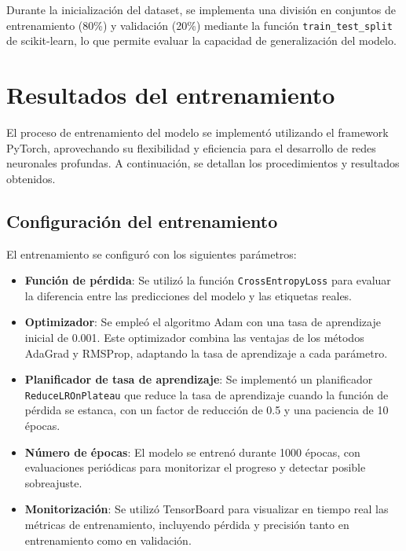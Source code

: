 Durante la inicialización del dataset, se implementa una división en conjuntos de entrenamiento (80\%) y validación (20\%) mediante la función \texttt{train\_test\_split} de scikit-learn, lo que permite evaluar la capacidad de generalización del modelo.

\section{Resultados del entrenamiento}

El proceso de entrenamiento del modelo se implementó utilizando el framework PyTorch, aprovechando su flexibilidad y eficiencia para el desarrollo de redes neuronales profundas. A continuación, se detallan los procedimientos y resultados obtenidos.

\subsection{Configuración del entrenamiento}

El entrenamiento se configuró con los siguientes parámetros:

\begin{itemize}
    \item \textbf{Función de pérdida}: Se utilizó la función \texttt{CrossEntropyLoss} para evaluar la diferencia entre las predicciones del modelo y las etiquetas reales.
    
    \item \textbf{Optimizador}: Se empleó el algoritmo Adam con una tasa de aprendizaje inicial de 0.001. Este optimizador combina las ventajas de los métodos AdaGrad y RMSProp, adaptando la tasa de aprendizaje a cada parámetro.
    
    \item \textbf{Planificador de tasa de aprendizaje}: Se implementó un planificador \texttt{ReduceLROnPlateau} que reduce la tasa de aprendizaje cuando la función de pérdida se estanca, con un factor de reducción de 0.5 y una paciencia de 10 épocas.
    
    \item \textbf{Número de épocas}: El modelo se entrenó durante 1000 épocas, con evaluaciones periódicas para monitorizar el progreso y detectar posible sobreajuste.
    
    \item \textbf{Monitorización}: Se utilizó TensorBoard para visualizar en tiempo real las métricas de entrenamiento, incluyendo pérdida y precisión tanto en entrenamiento como en validación.
\end{itemize}

